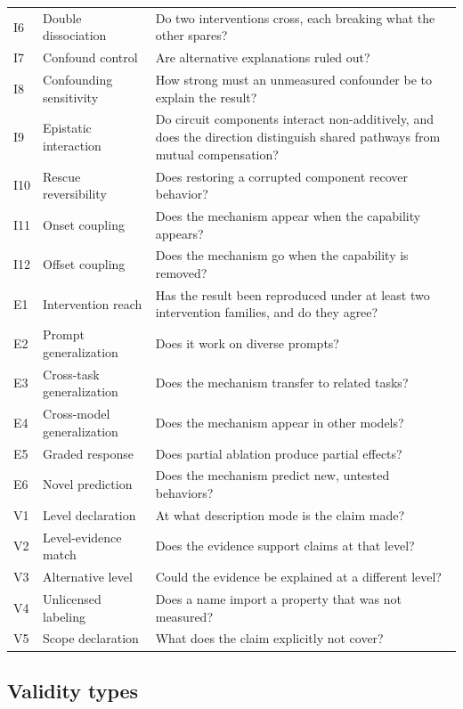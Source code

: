 \documentclass{article}
\begin{document}
\begin{table}[tbp]
\begin{tabular}{@{}llp{7.6cm}@{}}
I6 & Double dissociation & Do two interventions cross, each breaking what the other spares? \\
I7 & Confound control & Are alternative explanations ruled out? \\
I8 & Confounding sensitivity & How strong must an unmeasured confounder be to explain the result? \\
I9 & Epistatic interaction & Do circuit components interact non-additively, and does the direction distinguish shared pathways from mutual compensation? \\
I10 & Rescue reversibility & Does restoring a corrupted component recover behavior? \\
I11 & Onset coupling & Does the mechanism appear when the capability appears? \\
I12 & Offset coupling & Does the mechanism go when the capability is removed? \\
\midrule
E1 & Intervention reach & Has the result been reproduced under at least two intervention families, and do they agree? \\
E2 & Prompt generalization & Does it work on diverse prompts? \\
E3 & Cross-task generalization & Does the mechanism transfer to related tasks? \\
E4 & Cross-model generalization & Does the mechanism appear in other models? \\
E5 & Graded response & Does partial ablation produce partial effects? \\
E6 & Novel prediction & Does the mechanism predict new, untested behaviors? \\
\midrule
V1 & Level declaration & At what description mode is the claim made? \\
V2 & Level-evidence match & Does the evidence support claims at that level? \\
V3 & Alternative level & Could the evidence be explained at a different level? \\
V4 & Unlicensed labeling & Does a name import a property that was not measured? \\
V5 & Scope declaration & What does the claim explicitly not cover? \\
\bottomrule
\end{tabular}
\end{table}
\endgroup

\subsection{Validity types}
\label{sec:validity-types}
\end{document}
